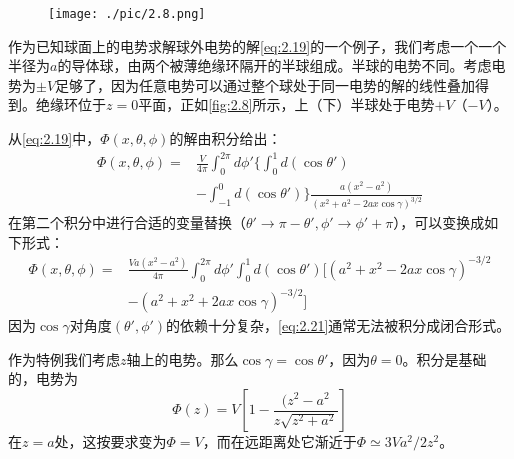 \documentclass[12pt]{book}
\numberwithin{equation}{chapter}
\numberwithin{figure}{chapter}
\numberwithin{footnote}{page}
\begin{document}
\begin{figure}[!ht]
    \centering
    \texttt{[image: ./pic/2.8.png]}
    \captionsetup{justification=raggedright, singlelinecheck=false}
    \caption{}
    \label{fig:2.8}
\end{figure}

作为已知球面上的电势求解球外电势的解\autoref{eq:2.19}的一个例子，我们考虑一个一个半径为$a$的导体球，由两个被薄绝缘环隔开的半球组成。半球的电势不同。考虑电势为$\pm V$足够了，因为任意电势可以通过整个球处于同一电势的解的线性叠加得到。绝缘环位于$z=0$平面，正如\autoref{fig:2.8}所示，上（下）半球处于电势$+V$（$-V$）。

从\autoref{eq:2.19}中，$\Phi(x,\theta,\phi)$的解由积分给出：
\begin{equation}\label{eq:2.20}
    \begin{aligned}
        \Phi(x,\theta,\phi)=&\frac{V}{4\pi}\int_0^{2\pi}d\phi'\{ \int_0^1 d(\cos\theta')\\
        &-\int_{-1}^0 d(\cos\theta')\}\frac{a(x^2-a^2)}{(x^2+a^2-2ax\cos\gamma)^{3/2}}
    \end{aligned}
\end{equation}
在第二个积分中进行合适的变量替换（$\theta'\to\pi-\theta',\phi'\to\phi'+\pi$），可以变换成如下形式：
\begin{equation}\label{eq:2.21}
    \begin{aligned}
        \Phi(x,\theta,\phi)=&\frac{Va(x^2-a^2)}{4\pi}\int_0^{2\pi}d\phi' \int_0^1 d(\cos\theta')[(a^2+x^2-2ax\cos\gamma)^{-3/2}\\
        &-(a^2+x^2+2ax\cos\gamma)^{-3/2}]
    \end{aligned}
\end{equation}
因为$\cos\gamma$对角度$(\theta',\phi')$的依赖十分复杂，\autoref{eq:2.21}通常无法被积分成闭合形式。

作为特例我们考虑$z$轴上的电势。那么$\cos\gamma=\cos\theta'$，因为$\theta=0$。积分是基础的，电势为
\begin{equation}\label{eq:2.22}
    \Phi(z)=V[1-\frac{(z^2-a^2}{z\sqrt{z^2+a^2}}]
\end{equation}
在$z=a$处，这按要求变为$\Phi=V$，而在远距离处它渐近于$\Phi\simeq 3Va^2/2z^2$。
\end{document}
